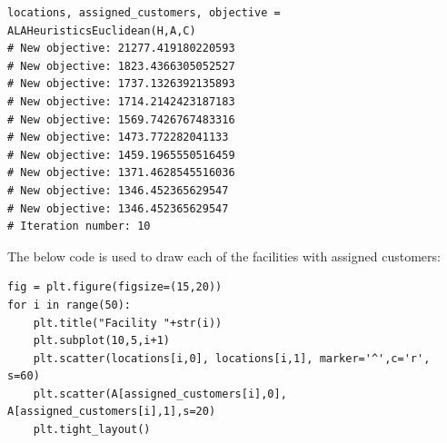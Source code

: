 \documentclass[12pt]{article}
\begin{document}
\begin{lstlisting}[style=pythonstyle]
locations, assigned_customers, objective = ALAHeuristicsEuclidean(H,A,C)
# New objective: 21277.419180220593
# New objective: 1823.4366305052527
# New objective: 1737.1326392135893
# New objective: 1714.2142423187183
# New objective: 1569.7426767483316
# New objective: 1473.772282041133
# New objective: 1459.1965550516459
# New objective: 1371.4628545516036
# New objective: 1346.452365629547
# New objective: 1346.452365629547
# Iteration number: 10
\end{lstlisting}

The below code is used to draw each of the facilities with assigned customers:
\begin{lstlisting}[style=pythonstyle]
fig = plt.figure(figsize=(15,20))
for i in range(50):
    plt.title("Facility "+str(i))
    plt.subplot(10,5,i+1)
    plt.scatter(locations[i,0], locations[i,1], marker='^',c='r', s=60)
    plt.scatter(A[assigned_customers[i],0], A[assigned_customers[i],1],s=20)
    plt.tight_layout()
\end{lstlisting}
\end{document}
